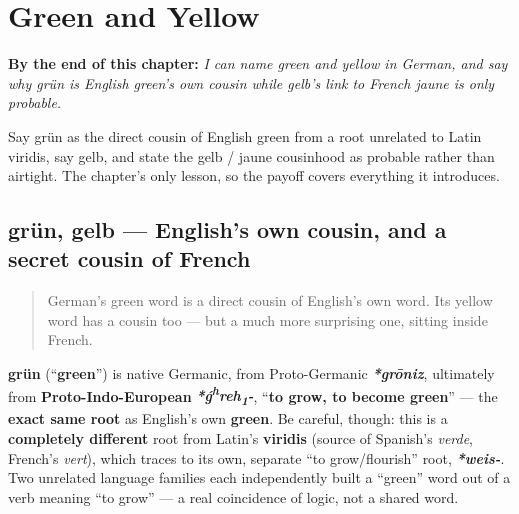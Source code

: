 
\chapter{Green and Yellow}
\label{ch:ge-green-and-yellow}

\begin{chapteropening}
\textbf{By the end of this chapter:} \emph{I can name green and yellow in German, and say why grün is English green's own cousin while gelb's link to French jaune is only probable.}

Say grün as the direct cousin of English green from a root unrelated to Latin viridis, say gelb, and state the gelb / jaune cousinhood as probable rather than airtight. The chapter's only lesson, so the payoff covers everything it introduces.
\end{chapteropening}

\section[grün, gelb]{grün, gelb — English's own cousin, and a secret cousin of French}

\label{lesson:GE-C23-gruen-gelb}



\begin{quote}
German's green word is a direct cousin of English's own word. Its yellow word has a cousin too — but a much more surprising one, sitting inside French.
\end{quote}

\begin{cousinweb}
\textbf{grün} (\textquotedblleft{}\textbf{green}\textquotedblright{}) is native Germanic, from Proto-Germanic \emph{\textbf{*grōniz}}, ultimately from \textbf{Proto-Indo-European} \emph{\textbf{*ǵ\textsuperscript{h}reh\textsubscript{1}-}}, \textquotedblleft{}\textbf{to grow, to become green}\textquotedblright{} — the \textbf{exact same root} as English's own \textbf{green}. Be careful, though: this is a \textbf{completely different} root from Latin's \textbf{viridis} (source of Spanish's \emph{verde}, French's \emph{vert}), which traces to its own, separate \textquotedblleft{}to grow/flourish\textquotedblright{} root, \emph{\textbf{*weis-}}. Two unrelated language families each independently built a \textquotedblleft{}green\textquotedblright{} word out of a verb meaning \textquotedblleft{}to grow\textquotedblright{} — a real coincidence of logic, not a shared word.
\end{cousinweb}

